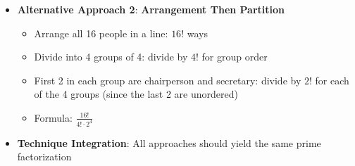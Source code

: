 \documentclass[12pt]{article}
\begin{document}
\begin{techniquesbox}
\begin{itemize}[leftmargin=*]
    \item \textbf{Alternative Approach 2}: \textbf{Arrangement Then Partition}
    \begin{itemize}
        \item Arrange all 16 people in a line: $16!$ ways
        \item Divide into 4 groups of 4: divide by $4!$ for group order
        \item First 2 in each group are chairperson and secretary: divide by $2!$ for each of the 4 groups (since the last 2 are unordered)
        \item Formula: $\frac{16!}{4! \cdot 2^4}$
    \end{itemize}
    
    \item \textbf{Technique Integration}: All approaches should yield the same prime factorization
\end{itemize}
\end{techniquesbox}
\end{document}
